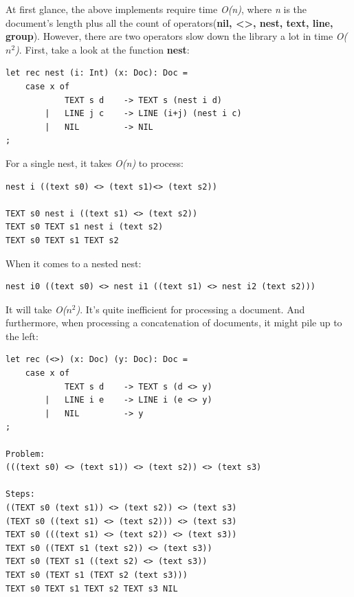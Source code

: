 At first glance, the above implements require time \textit{O(n)}, where \textit{n} is the document's length plus all the count of operators(\textbf{nil, <>, nest, text, line, group}). However, there are two operators slow down the library a lot in time \textit{O($n^2$)}. First, take a look at the function \textbf{nest}:
\begin{lstlisting}
let rec nest (i: Int) (x: Doc): Doc =
    case x of
            TEXT s d    -> TEXT s (nest i d)
        |   LINE j c    -> LINE (i+j) (nest i c)
        |   NIL         -> NIL
;
\end{lstlisting}
For a single nest, it takes \textit{O(n)} to process:
\begin{lstlisting}
nest i ((text s0) <> (text s1)<> (text s2))

TEXT s0 nest i ((text s1) <> (text s2))
TEXT s0 TEXT s1 nest i (text s2)
TEXT s0 TEXT s1 TEXT s2
\end{lstlisting}
When it comes to a nested nest:
\begin{lstlisting}
nest i0 ((text s0) <> nest i1 ((text s1) <> nest i2 (text s2)))
\end{lstlisting}
It will take \textit{O($n^2$)}. It's quite inefficient for processing a document. And furthermore, when processing a concatenation of documents, it might pile up to the left:
\begin{lstlisting}
let rec (<>) (x: Doc) (y: Doc): Doc =
    case x of
            TEXT s d    -> TEXT s (d <> y)
        |   LINE i e    -> LINE i (e <> y)
        |   NIL         -> y
;

Problem:
(((text s0) <> (text s1)) <> (text s2)) <> (text s3)

Steps:
((TEXT s0 (text s1)) <> (text s2)) <> (text s3)
(TEXT s0 ((text s1) <> (text s2))) <> (text s3)
TEXT s0 (((text s1) <> (text s2)) <> (text s3))
TEXT s0 ((TEXT s1 (text s2)) <> (text s3))
TEXT s0 (TEXT s1 ((text s2) <> (text s3))
TEXT s0 (TEXT s1 (TEXT s2 (text s3)))
TEXT s0 TEXT s1 TEXT s2 TEXT s3 NIL
\end{lstlisting}

